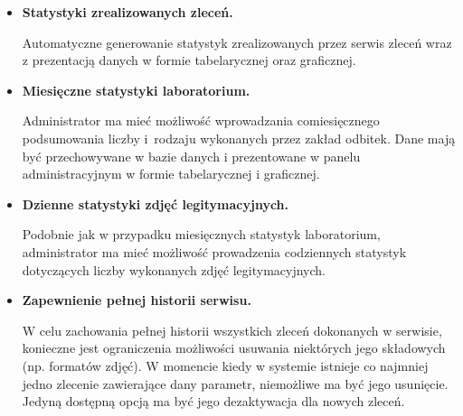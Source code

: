 \begin{itemize}
    \item \textbf{Statystyki zrealizowanych zleceń.}
    
    Automatyczne generowanie statystyk zrealizowanych przez serwis zleceń wraz z prezentacją danych w formie tabelarycznej oraz graficznej.
    
    \item \textbf{Miesięczne statystyki laboratorium.}
    
    Administrator ma mieć możliwość wprowadzania comiesięcznego podsumowania liczby i~rodzaju wykonanych przez zakład odbitek. Dane mają być przechowywane w bazie danych i prezentowane w panelu administracyjnym w formie tabelarycznej i graficznej.
    
    \item \textbf{Dzienne statystyki zdjęć legitymacyjnych.}
    
    Podobnie jak w przypadku miesięcznych statystyk laboratorium, administrator ma mieć możliwość prowadzenia codziennych statystyk dotyczących liczby wykonanych zdjęć legitymacyjnych.

    \item \textbf{Zapewnienie pełnej historii serwisu.}
    
    W celu zachowania pełnej historii wszystkich zleceń dokonanych w serwisie, konieczne jest ograniczenia możliwości usuwania niektórych jego składowych (np. formatów zdjęć). W momencie kiedy w systemie istnieje co najmniej jedno zlecenie zawierające dany parametr, niemożliwe ma być jego usunięcie. Jedyną dostępną opcją ma być jego dezaktywacja dla nowych zleceń.
    
\end{itemize}

